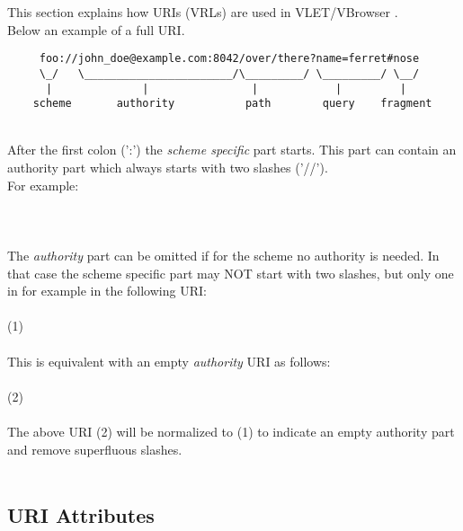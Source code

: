 This section explains how URIs (VRLs) are used in VLET/VBrowser .\\  
Below an example of a full URI.

\hspace*{10mm}\begin{minipage}{170mm}
\begin{verbatim}
     foo://john_doe@example.com:8042/over/there?name=ferret#nose
     \_/   \_______________________/\_________/ \_________/ \__/
      |              |                |            |         |
    scheme       authority           path        query    fragment
\end{verbatim}
 \end{minipage}\\

After the first colon (':') the \emph{scheme specific} part starts. 
This part can contain an authority part which always starts with two slashes
('//').\\
For example:\\
\\
  \tab {}\\
\\
The \emph{authority} part can be omitted if for the scheme no authority is
needed. In that case the scheme specific part may NOT start with two slashes,
but only one in for example in the following URI:\\
\\
   \tab (1) \\
\\
This is equivalent with an empty \emph{authority} URI as follows:\\
\\
   \tab (2) \\ 
\\ 
The above URI (2) will be normalized to (1) to indicate an empty authority
part and remove superfluous slashes.\\
\\
\subsection{URI Attributes}

